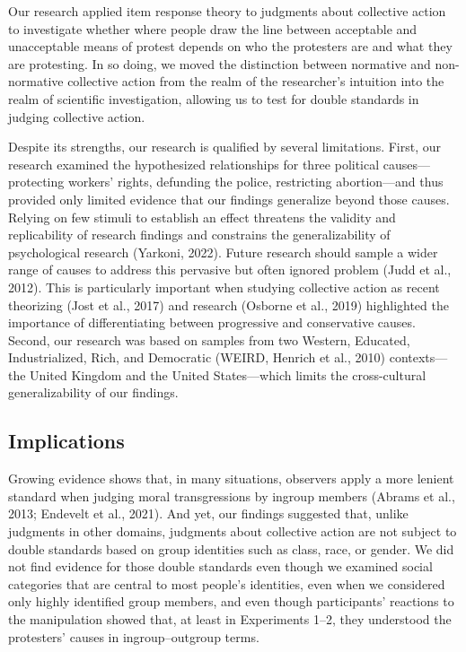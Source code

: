 \documentclass[12pt, letterpaper]{article}
\begin{document}
Our research applied item response theory to judgments about collective
action to investigate whether where people draw the line between
acceptable and unacceptable means of protest depends on who the
protesters are and what they are protesting. In so doing, we moved the
distinction between normative and non-normative collective action from
the realm of the researcher's intuition into the realm of scientific
investigation, allowing us to test for double standards in judging
collective action.

Despite its strengths, our research is qualified by several limitations.
First, our research examined the hypothesized relationships for three
political causes---protecting workers' rights, defunding the police,
restricting abortion---and thus provided only limited evidence that our
findings generalize beyond those causes. Relying on few stimuli to
establish an effect threatens the validity and replicability of research
findings and constrains the generalizability of psychological research
(Yarkoni, 2022). Future research should sample a wider range of causes
to address this pervasive but often ignored problem (Judd et al., 2012).
This is particularly important when studying collective action as recent
theorizing (Jost et al., 2017) and research (Osborne et al., 2019)
highlighted the importance of differentiating between progressive and
conservative causes. Second, our research was based on samples from two
Western, Educated, Industrialized, Rich, and Democratic (WEIRD, Henrich
et al., 2010) contexts---the United Kingdom and the United
States---which limits the cross-cultural generalizability of our
findings.

\hypertarget{implications}{%
\subsection{Implications}\label{implications}}

Growing evidence shows that, in many situations, observers apply a more
lenient standard when judging moral transgressions by ingroup members
(Abrams et al., 2013; Endevelt et al., 2021). And yet, our findings
suggested that, unlike judgments in other domains, judgments about
collective action are not subject to double standards based on group
identities such as class, race, or gender. We did not find evidence for
those double standards even though we examined social categories that
are central to most people's identities, even when we considered only
highly identified group members, and even though participants' reactions
to the manipulation showed that, at least in Experiments 1--2, they
understood the protesters' causes in ingroup--outgroup terms.
\end{document}
